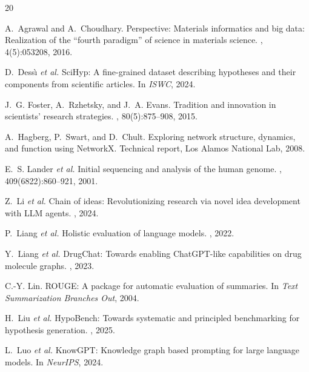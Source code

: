 \documentclass{article}
\newcommand{\etal}{\textit{et al.}}
\begin{document}
\begin{thebibliography}{20}

A.~Agrawal and A.~Choudhary.
\newblock Perspective: Materials informatics and big data: Realization of the ``fourth paradigm'' of science in materials science.
, 4(5):053208, 2016.

D.~Dess\`{\i} \etal{}
\newblock SciHyp: A fine-grained dataset describing hypotheses and their components from scientific articles.
\newblock In {\em ISWC}, 2024.

J.~G. Foster, A.~Rzhetsky, and J.~A. Evans.
\newblock Tradition and innovation in scientists' research strategies.
, 80(5):875--908, 2015.

A.~Hagberg, P.~Swart, and D.~Chult.
\newblock Exploring network structure, dynamics, and function using NetworkX.
\newblock Technical report, Los Alamos National Lab, 2008.

E.~S. Lander \etal{}
\newblock Initial sequencing and analysis of the human genome.
, 409(6822):860--921, 2001.

Z.~Li \etal{}
\newblock Chain of ideas: Revolutionizing research via novel idea development with LLM agents.
, 2024.

P.~Liang \etal{}
\newblock Holistic evaluation of language models.
, 2022.

Y.~Liang \etal{}
\newblock DrugChat: Towards enabling ChatGPT-like capabilities on drug molecule graphs.
, 2023.

C.-Y. Lin.
\newblock ROUGE: A package for automatic evaluation of summaries.
\newblock In {\em Text Summarization Branches Out}, 2004.

H.~Liu \etal{}
\newblock HypoBench: Towards systematic and principled benchmarking for hypothesis generation.
, 2025.

L.~Luo \etal{}
\newblock KnowGPT: Knowledge graph based prompting for large language models.
\newblock In {\em NeurIPS}, 2024.


\end{thebibliography}
\end{document}
